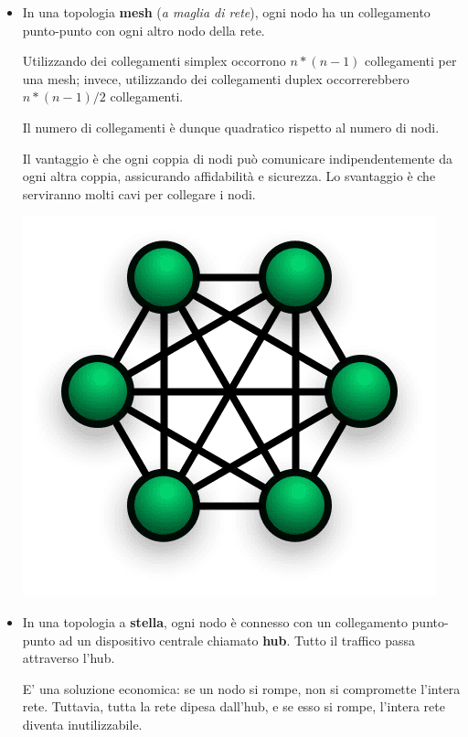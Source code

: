 \begin{itemize}
    \item 
    In una topologia \textbf{mesh} (\textit{a maglia di rete}), ogni nodo ha un collegamento punto-punto con ogni altro nodo della rete. 
    
    Utilizzando dei collegamenti simplex occorrono \(n*(n-1)\) collegamenti per una mesh; invece, utilizzando dei collegamenti duplex occorrerebbero \(n*(n-1)/2\) collegamenti.
    
    Il numero di collegamenti è dunque quadratico rispetto al numero di nodi.
    
    Il vantaggio è che ogni coppia di nodi può comunicare indipendentemente da ogni altra coppia, assicurando affidabilità e sicurezza. Lo svantaggio è che serviranno molti cavi per collegare i nodi.
    
    \begin{center}
        \includegraphics[scale=0.25]{images/MeshNetwork.png}
    \end{center}
    
    \item
    In una topologia a \textbf{stella}, ogni nodo è connesso con un collegamento punto-punto ad un dispositivo centrale chiamato \textbf{hub}. Tutto il traffico passa attraverso l'hub.
    
    E' una soluzione economica: se un nodo si rompe, non si compromette l'intera rete. Tuttavia, tutta la rete dipesa dall'hub, e se esso si rompe, l'intera rete diventa inutilizzabile.
    

\end{itemize}
